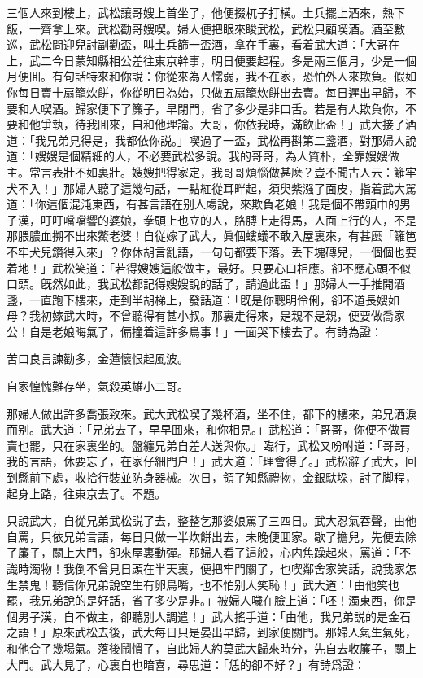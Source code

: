 三個人來到樓上，武松讓哥嫂上首坐了，他便掇杌子打横。土兵擺上酒來，熱下飯，一齊拿上來。武松勸哥嫂喫。婦人便把眼來睃武松，武松只顧喫酒。酒至數巡，武松問迎兒討副勸盃，叫土兵篩一盃酒，拿在手裏，看着武大道：「大哥在上，武二今日蒙知縣相公差往東京幹事，明日便要起程。多是兩三個月，少是一個月便囬。有句話特來和你說：你從來為人懦弱，我不在家，恐怕外人來欺負。假如你每日賣十扇籠炊餅，你從明日為始，只做五扇籠炊餅出去賣。每日遲出早歸，不要和人喫酒。歸家便下了簾子，早閉門，省了多少是非口舌。若是有人欺負你，不要和他爭執，待我囬來，自和他理論。大哥，你依我時，滿飲此盃！」武大接了酒道：「我兄弟見得是，我都依你説。」喫過了一盃，武松再斟第二盞酒，對那婦人說道：「嫂嫂是個精細的人，不必要武松多說。我的哥哥，為人質朴，全靠嫂嫂做主。常言表壯不如裏壯。嫂嫂把得家定，我哥哥煩惱做甚麽？豈不聞古人云：籬牢犬不入！」那婦人聽了這幾句話，一點紅從耳畔起，須臾紫漒了面皮，指着武大駡道：「你這個混沌東西，有甚言語在别人䖏說，來欺負老娘！我是個不帶頭巾的男子漢，叮叮噹噹響的婆娘，拳頭上也立的人，胳膊上走得馬，人面上行的人，不是那腲膿血搠不出來鱉老婆！自従嫁了武大，眞個螻蟻不敢入屋裏來，有甚麽「籬笆不牢犬兒鑽得入來」？你休胡言亂語，一句句都要下落。丢下塊磚兒，一個個也要着地！」武松笑道：「若得嫂嫂這般做主，最好。只要心口相應。卻不應心頭不似口頭。旣然如此，我武松都記得嫂嫂說的話了，請過此盃！」那婦人一手推開酒盞，一直跑下樓來，走到半胡梯上，發話道：「旣是你聰明伶俐，卻不道長嫂如母？我初嫁武大時，不曾聽得有甚小叔。那裏走得來，是親不是親，便要做喬家公！自是老娘晦氣了，偏撞着這許多鳥事！」一面哭下樓去了。有詩為證：

\begin{myquote}
苦口良言諫勸多，金蓮懷恨起風波。

自家惶愧難存坐，氣殺英雄小二哥。
\end{myquote}

那婦人做出許多喬張致來。武大武松喫了幾杯酒，坐不住，都下的樓來，弟兄洒淚而别。武大道：「兄弟去了，早早囬來，和你相見。」武松道：「哥哥，你便不做買賣也罷，只在家裏坐的。盤纏兄弟自差人送與你。」臨行，武松又吩咐道：「哥哥，我的言語，休要忘了，在家仔細門户！」武大道：「理會得了。」武松辭了武大，回到縣前下處，收拾行裝並防身器械。次日，領了知縣禮物，金銀馱垜，討了脚程，起身上路，往東京去了。不題。

只說武大，自從兄弟武松説了去，整整乞那婆娘駡了三四日。武大忍氣吞聲，由他自罵，只依兄弟言語，每日只做一半炊餅出去，未晚便囬家。歇了擔兒，先便去除了簾子，關上大門，卻來屋裏動彈。那婦人看了這般，心内焦躁起來，罵道：「不識時濁物！我倒不曾見日頭在半天裏，便把牢門關了，也喫鄰舍家笑話，說我家怎生禁鬼！聽信你兄弟說空生有卵鳥嘴，也不怕别人笑恥！」武大道：「由他笑也罷，我兄弟說的是好話，省了多少是非。」被婦人噦在臉上道：「呸！濁東西，你是個男子漢，自不做主，卻聽別人調遣！」武大搖手道：「由他，我兄弟説的是金石之語！」原來武松去後，武大每日只是晏出早歸，到家便關門。那婦人氣生氣死，和他合了幾場氣。落後鬧慣了，自此婦人約莫武大歸來時分，先自去收簾子，關上大門。武大見了，心裏自也暗喜，尋思道：「恁的卻不好？」有詩爲證：


